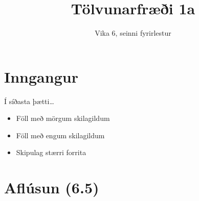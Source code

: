 \documentclass{beamer}
\title{Tölvunarfræði 1a}
\subtitle{Vika 6, seinni fyrirlestur}
\begin{document}
\begin{frame}
\titlepage
\end{frame}

\section{Inngangur}

\begin{frame}{Í síðasta þætti\ldots}
\begin{itemize}
 \item Föll með mörgum skilagildum
 \item Föll með engum skilagildum
 \item Skipulag stærri forrita
\end{itemize}
\end{frame}


\section{Aflúsun (6.5)}
\end{document}
